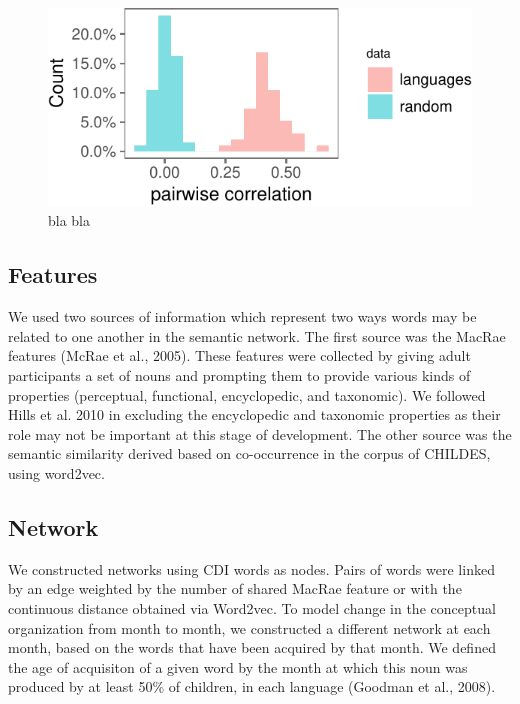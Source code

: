 \documentclass[11pt]{article}
\newenvironment{CodeChunk}{}{}
\begin{document}
\begin{CodeChunk}
\captionsetup{width=0.8\textwidth}\begin{figure}[h]

{\centering \includegraphics{figs/unnamed-chunk-1-1} 

}

\caption[bla bla]{bla bla}\label{fig:unnamed-chunk-1}
\end{figure}
\end{CodeChunk}

\subsection{Features}\label{features}

We used two sources of information which represent two ways words may be
related to one another in the semantic network. The first source was the
MacRae features (McRae et al., 2005). These features were collected by
giving adult participants a set of nouns and prompting them to provide
various kinds of properties (perceptual, functional, encyclopedic, and
taxonomic). We followed Hills et al. 2010 in excluding the encyclopedic
and taxonomic properties as their role may not be important at this
stage of development. The other source was the semantic similarity
derived based on co-occurrence in the corpus of CHILDES, using word2vec.

\subsection{Network}\label{network}

We constructed networks using CDI words as nodes. Pairs of words were
linked by an edge weighted by the number of shared MacRae feature or
with the continuous distance obtained via Word2vec. To model change in
the conceptual organization from month to month, we constructed a
different network at each month, based on the words that have been
acquired by that month. We defined the age of acquisiton of a given word
by the month at which this noun was produced by at least 50\% of
children, in each language (Goodman et al., 2008).
\end{document}

